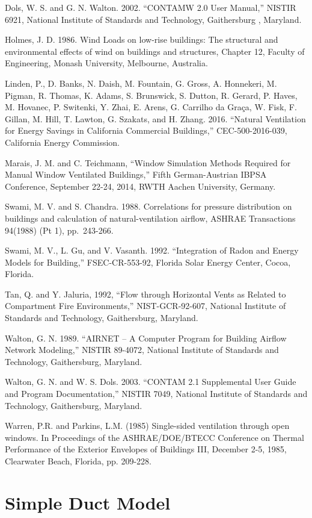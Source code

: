 Dols, W. S. and G. N. Walton. 2002. ``CONTAMW 2.0 User Manual,'' NISTIR 6921, National Institute of Standards and Technology, Gaithersburg , Maryland.

Holmes, J. D. 1986. Wind Loads on low-rise buildings: The structural and environmental effects of wind on buildings and structures, Chapter 12, Faculty of Engineering, Monash University, Melbourne, Australia.

Linden, P., D. Banks, N. Daish, M. Fountain, G. Gross, A. Honnekeri, M. Pigman, R. Thomas, K. Adams,
S. Brunswick, S. Dutton, R. Gerard, P. Haves, M. Hovanec, P. Switenki, Y. Zhai, E. Arens, G. Carrilho da Gra\c{c}a, W. Fisk, F. Gillan, M. Hill, T. Lawton, G. Szakats, and H. Zhang. 2016. ``Natural Ventilation for Energy Savings in California Commercial Buildings,'' CEC-500-2016-039, California Energy Commission.

Marais, J. M. and C. Teichmann, ``Window Simulation Methods Required for Manual Window Ventilated Buildings,'' Fifth German-Austrian IBPSA Conference, September 22-24, 2014, RWTH Aachen University, Germany.

Swami, M. V. and S. Chandra. 1988. Correlations for pressure distribution on buildings and calculation of natural-ventilation airflow, ASHRAE Transactions 94(1988) (Pt 1), pp.~243-266.

Swami, M. V., L. Gu, and V. Vasanth. 1992. ``Integration of Radon and Energy Models for Building,'' FSEC-CR-553-92, Florida Solar Energy Center, Cocoa, Florida.

Tan, Q. and Y. Jaluria, 1992, ``Flow through Horizontal Vents as Related to Compartment Fire Environments,'' NIST-GCR-92-607, National Institute of Standards and Technology, Gaithersburg, Maryland.

Walton, G. N. 1989. ``AIRNET -- A Computer Program for Building Airflow Network Modeling,'' NISTIR 89-4072, National Institute of Standards and Technology, Gaithersburg, Maryland.

Walton, G. N. and W. S. Dols. 2003. ``CONTAM 2.1 Supplemental User Guide and Program Documentation,'' NISTIR 7049, National Institute of Standards and Technology, Gaithersburg, Maryland.

Warren, P.R. and Parkins, L.M. (1985) Single-sided ventilation through open windows. In Proceedings of the ASHRAE/DOE/BTECC Conference on Thermal Performance of the Exterior Envelopes of Buildings III, December 2-5, 1985, Clearwater Beach, Florida, pp. 209-228.

\section{Simple Duct Model}\label{simple-duct-model}

